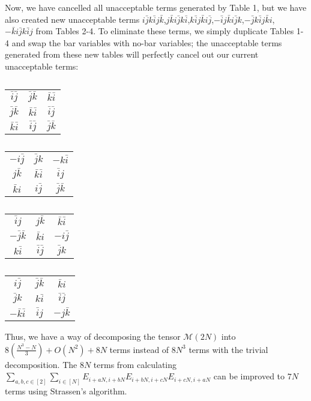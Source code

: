 \documentclass{article}
\begin{document}
Now, we have cancelled all unacceptable terms generated by Table 1, but we have also created new unacceptable terms $i\bar{j}k\bar{i}j\bar{k}$,$j\bar{k}i\bar{j}k\bar{i}$,$k\bar{i}j\bar{k}i\bar{j}$,$-\bar{i}j\bar{k}i\bar{j}k$,$-\bar{j}k\bar{i}j\bar{k}i$,\\$-\bar{k}i\bar{j}k\bar{i}j$ from Tables 2-4. To eliminate these terms, we simply duplicate Tables 1-4 and swap the bar variables with no-bar variables; the unacceptable terms generated from these new tables will perfectly cancel out our current unacceptable terms:

\begin{table}[H]
    \centering
    \begin{tabular}{c|c|c}
        $\bar{i}\bar{j}$ & $\bar{j}\bar{k}$ & $\bar{k}\bar{i}$ \\
        $\bar{j}\bar{k}$ & $\bar{k}\bar{i}$ & $\bar{i}\bar{j}$ \\
        $\bar{k}\bar{i}$ & $\bar{i}\bar{j}$ & $\bar{j}\bar{k}$ \\
    \end{tabular}
    \caption{}
\end{table}

\begin{table}[H]
    \centering
    \begin{tabular}{c|c|c}
        $-i\bar{j}$ & $\bar{j}k$ & $-k\bar{i}$ \\
        $j\bar{k}$ & $\bar{k}\bar{i}$ & $\bar{i}j$ \\
        $\bar{k}i$ & $i\bar{j}$ & $\bar{j}\bar{k}$ \\
    \end{tabular}
    \caption{}
\end{table}

\begin{table}[H]
    \centering
    \begin{tabular}{c|c|c}
        $\bar{i}j$ & $j\bar{k}$ & $\bar{k}\bar{i}$ \\
        $-\bar{j}\bar{k}$ & $\bar{k}i$ & $-i\bar{j}$ \\
        $k\bar{i}$ & $\bar{i}\bar{j}$ & $\bar{j}k$ \\
    \end{tabular}
    \caption{}
\end{table}

\begin{table}[H]
    \centering
    \begin{tabular}{c|c|c}
        $i\bar{j}$ & $\bar{j}\bar{k}$ & $\bar{k}i$ \\
        $\bar{j}k$ & $k\bar{i}$ & $\bar{i}\bar{j}$ \\
        $-\bar{k}\bar{i}$ & $\bar{i}j$ & $-j\bar{k}$ \\
    \end{tabular}
    \caption{}
\end{table}

Thus, we have a way of decomposing the tensor $\mathcal{M}(2N)$ into $8(\frac{N^3-N}{3})+O(N^2)+8N$ terms instead of $8N^3$ terms with the trivial decomposition. The $8N$ terms from calculating $\sum_{a,b,c\in [2]}\sum_{i\in [N]} E_{i+aN,i+bN}E_{i+bN,i+cN}E_{i+cN,i+aN}$ can be improved to $7N$ terms using Strassen's algorithm.
\end{document}
